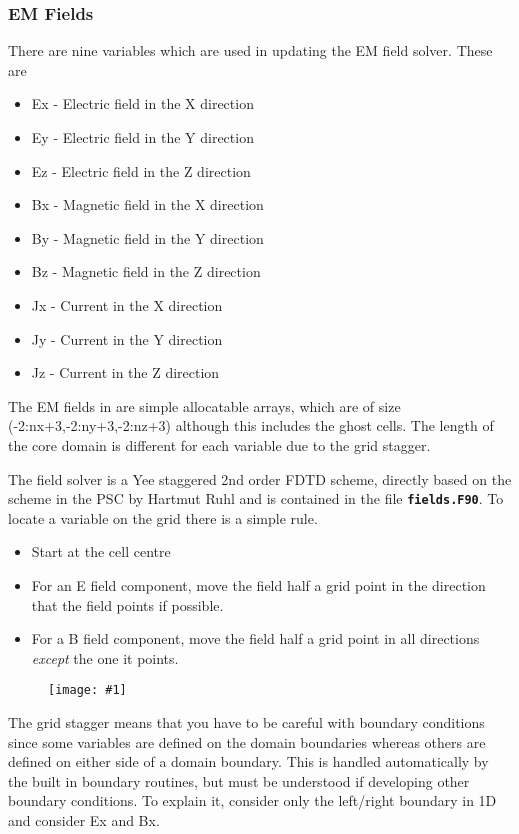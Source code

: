 \documentclass[12pt,a4paper]{article}
\newcommand{\inlinecode}[1]{{\color{warwickred} \bf\texttt{#1}}}
\newcommand{\EPOCH}{{\color{warwickdark}\fontfamily{phv}\selectfont{EPOCH}}}
\newcommand{\image}[1]
  {{\begin{figure}\centering\texttt{[image: \#1]}\end{figure}}}
\begin{document}
\subsubsection{EM Fields}
There are nine variables which are used in updating the EM field solver. These
are
\begin{itemize}
\item Ex - Electric field in the X direction
\item Ey - Electric field in the Y direction
\item Ez - Electric field in the Z direction
\item Bx - Magnetic field in the X direction
\item By - Magnetic field in the Y direction
\item Bz - Magnetic field in the Z direction
\item Jx - Current in the X direction
\item Jy - Current in the Y direction
\item Jz - Current in the Z direction
\end{itemize}
The EM fields in {\EPOCH} are simple allocatable arrays, which are of size
(-2:nx+3,-2:ny+3,-2:nz+3) although this includes the ghost cells. The length of
the core domain is different for each variable due to the grid stagger.

The {\EPOCH} field solver is a Yee staggered 2nd order FDTD scheme, directly
based on the scheme in the PSC by Hartmut Ruhl and is contained in the file
\inlinecode{fields.F90}. To locate a variable on the grid there is a simple
rule.
\begin{itemize}
\item Start at the cell centre
\item For an E field component, move the field half a grid point in the
  direction that the field points if possible.
\item For a B field component, move the field half a grid point in all
  directions {\it except} the one it points.
\end{itemize}

\image{./images/stagger}

The grid stagger means that you have to be careful with boundary conditions
since some variables are defined on the domain boundaries whereas others are
defined on either side of a domain boundary. This is handled automatically by
the built in boundary routines, but must be understood if developing other
boundary conditions. To explain it, consider only the left/right boundary in 1D
and consider Ex and Bx.\\
\end{document}
